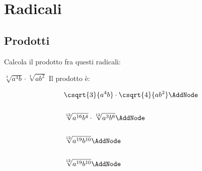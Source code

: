 \chapter{Radicali}
\section{Prodotti}
Calcola il prodotto fra questi radicali:
\tcbstartrecording
\begin{exercise}
$\sqrt[3]{a^4b}\cdot\sqrt[4]{ab^2}$
	\tcblower
	Il prodotto è:
\begin{NodesList}
	\begin{align*}
		&\csqrt{3}{a^4b}\cdot\csqrt{4}{ab^2} \AddNode\\ &\\
		&\sqrt[12]{a^{16}b^4}\cdot\sqrt[12]{a^3b^6} \AddNode\\ &\\
		&\sqrt[12]{a^{19}b^{10}} \AddNode\\ &\\
		&\sqrt[12]{a^{19}b^{10}} \AddNode\\ &\\
	\end{align*}
			
						\end{NodesList}
\end{exercise}
